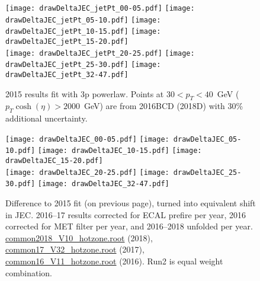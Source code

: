 \documentclass[landscape,10pt]{beamer} %
\begin{document}
\newpage

\begin{figure}[p]
\centering
  \texttt{[image: drawDeltaJEC\_jetPt\_00-05.pdf]}
  \texttt{[image: drawDeltaJEC\_jetPt\_05-10.pdf]}
  \texttt{[image: drawDeltaJEC\_jetPt\_10-15.pdf]}
  \texttt{[image: drawDeltaJEC\_jetPt\_15-20.pdf]}\\
  \texttt{[image: drawDeltaJEC\_jetPt\_20-25.pdf]}
  \texttt{[image: drawDeltaJEC\_jetPt\_25-30.pdf]}
  \texttt{[image: drawDeltaJEC\_jetPt\_32-47.pdf]}
\caption{2015 results fit with 3p powerlaw. Points at $30<p_{T}<40$~GeV ($p_{T}\cosh(\eta)>2000$~GeV) are from 2016BCD (2018D) with 30\% additional uncertainty.}
\end{figure}

\newpage

\begin{figure}[p]
\centering
  \texttt{[image: drawDeltaJEC\_00-05.pdf]}
  \texttt{[image: drawDeltaJEC\_05-10.pdf]}
  \texttt{[image: drawDeltaJEC\_10-15.pdf]}
  \texttt{[image: drawDeltaJEC\_15-20.pdf]}\\
  \texttt{[image: drawDeltaJEC\_20-25.pdf]}
  \texttt{[image: drawDeltaJEC\_25-30.pdf]}
  \texttt{[image: drawDeltaJEC\_32-47.pdf]}
  \caption{Difference to 2015 fit (on previous page), turned into equivalent shift in JEC. 2016--17 results corrected for ECAL prefire per year, 2016 corrected for MET filter per year, and 2016--2018 unfolded per year.
\href{https://gitlab.cern.ch/lamartik/combinationfiles/common2018_V10_hotzone.root}{common2018\_V10\_hotzone.root} (2018),
\href{https://gitlab.cern.ch/lamartik/combinationfiles/common17_V32_hotzone.root}{common17\_V32\_hotzone.root} (2017), 
\href{https://gitlab.cern.ch/lamartik/combinationfiles/common16_V11_hotzone.root}{common16\_V11\_hotzone.root} (2016). Run2 is equal weight combination.}
\end{figure}
\end{document}
